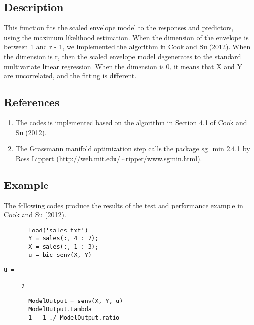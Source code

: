 \documentclass[a4paper,11pt,openany]{memoir}
\begin{document}
\subsection*{Description}

\begin{par}
This function fits the scaled envelope model to the responses and predictors, using the maximum likelihood estimation.  When the dimension of the envelope is between 1 and r - 1, we implemented the algorithm in Cook and Su (2012).  When the dimension is r, then the scaled envelope model degenerates to the standard multivariate linear regression.  When the dimension is 0, it means that X and Y are uncorrelated, and the fitting is different.
\end{par} \vspace{1em}


\subsection*{References}

\begin{enumerate}
\setlength{\itemsep}{-1ex}
   \item The codes is implemented based on the algorithm in Section 4.1 of Cook and Su (2012).
   \item The Grassmann manifold optimization step calls the package sg\_min 2.4.1 by Ross Lippert (http://web.mit.edu/$\sim$ripper/www.sgmin.html).
\end{enumerate}


\subsection*{Example}

\begin{par}
The following codes produce the results of the test and performance example in Cook and Su (2012).
\end{par} \vspace{1em}

\begin{verbatim}       load('sales.txt')
       Y = sales(:, 4 : 7);
       X = sales(:, 1 : 3);
       u = bic_senv(X, Y)\end{verbatim}    
        \color{lightgray}\ttfamily \begin{verbatim}
u =

     2
\end{verbatim} \rmfamily
\color{black}       
       \begin{verbatim}
       ModelOutput = senv(X, Y, u)
       ModelOutput.Lambda
       1 - 1 ./ ModelOutput.ratio\end{verbatim}
\end{document}
